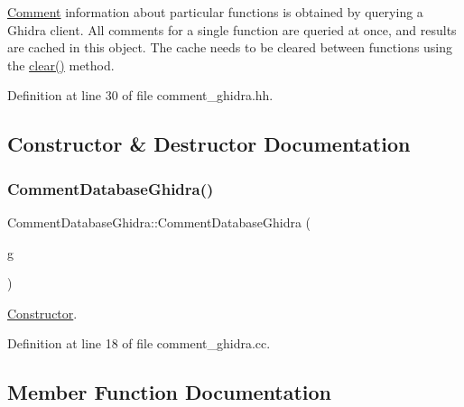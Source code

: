\mbox{\hyperlink{class_comment}{Comment}} information about particular functions is obtained by querying a Ghidra client. All comments for a single function are queried at once, and results are cached in this object. The cache needs to be cleared between functions using the \mbox{\hyperlink{class_comment_database_ghidra_a723dd4415e6eab6c4b5edacbc97a9332}{clear()}} method. 

Definition at line 30 of file comment\+\_\+ghidra.\+hh.



\subsection{Constructor \& Destructor Documentation}
\mbox{\label{class_comment_database_ghidra_a82d38a9bf0a21a74bb3327c0782e50f4}} 
\subsubsection{\texorpdfstring{CommentDatabaseGhidra()}{CommentDatabaseGhidra()}}
{\footnotesize\ttfamily Comment\+Database\+Ghidra\+::\+Comment\+Database\+Ghidra (\begin{DoxyParamCaption}\item[{\mbox{\hyperlink{class_architecture_ghidra}{Architecture\+Ghidra}} $\ast$}]{g }\end{DoxyParamCaption})}



\mbox{\hyperlink{class_constructor}{Constructor}}. 



Definition at line 18 of file comment\+\_\+ghidra.\+cc.



\subsection{Member Function Documentation}
\mbox{\label{class_comment_database_ghidra_ac4391823aa263f7c1b3488a825a534a9}} 
